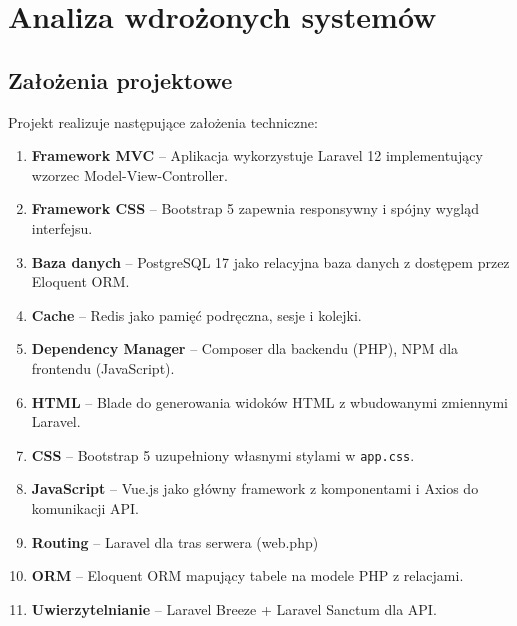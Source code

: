 \documentclass[12pt,a4paper]{article}
\begin{document}
\newpage

\section{Analiza wdrożonych systemów}

\subsection{Założenia projektowe}

Projekt realizuje następujące założenia techniczne:

\begin{enumerate}[itemsep=3pt]
    \item \textbf{Framework MVC} -- Aplikacja wykorzystuje Laravel 12 implementujący wzorzec Model-View-Controller.
    
    \item \textbf{Framework CSS} -- Bootstrap 5 zapewnia responsywny i spójny wygląd interfejsu.
    
    \item \textbf{Baza danych} -- PostgreSQL 17 jako relacyjna baza danych z dostępem przez Eloquent ORM.
    
    \item \textbf{Cache} -- Redis jako pamięć podręczna, sesje i kolejki.
    
    \item \textbf{Dependency Manager} -- Composer dla backendu (PHP), NPM dla frontendu (JavaScript).
    
    \item \textbf{HTML} -- Blade do generowania widoków HTML z wbudowanymi zmiennymi Laravel.
    
    \item \textbf{CSS} -- Bootstrap 5 uzupełniony własnymi stylami w \texttt{app.css}.
    
    \item \textbf{JavaScript} -- Vue.js jako główny framework z komponentami i Axios do komunikacji API.
    
    \item \textbf{Routing} -- Laravel dla tras serwera (web.php)
    
    \item \textbf{ORM} -- Eloquent ORM mapujący tabele na modele PHP z relacjami.
    
    \item \textbf{Uwierzytelnianie} -- Laravel Breeze + Laravel Sanctum dla API.
    

\end{enumerate}
\end{document}
